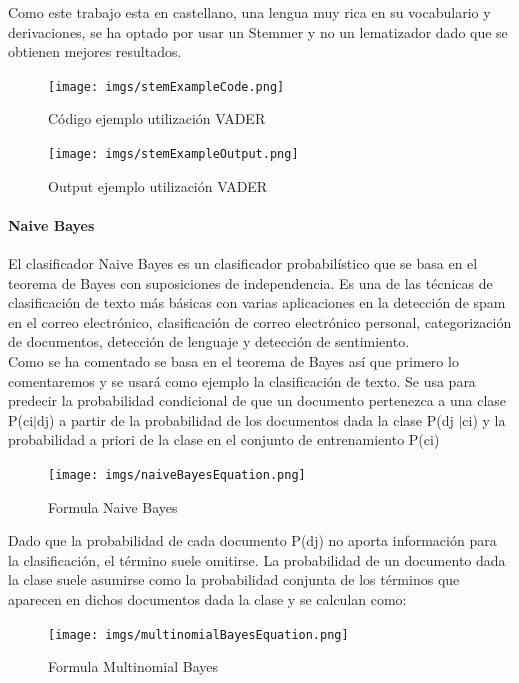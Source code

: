 \documentclass[../all.tex]{subfiles}
\begin{document}
        	Como este trabajo esta en castellano, una lengua muy rica en su vocabulario y derivaciones, se ha optado por usar un Stemmer y no un lematizador dado que se obtienen mejores resultados.\\
        	
        	\begin{figure}[H]
        		\centering
        		\texttt{[image: imgs/stemExampleCode.png]}
        		\caption{Código ejemplo utilización VADER}
        	\end{figure}
        	\begin{figure}[H]
        		\centering
        		\texttt{[image: imgs/stemExampleOutput.png]}
        		\caption{Output ejemplo utilización VADER}
        	\end{figure}
        	
        	

        \paragraph{Naive Bayes}
        
        	El clasificador Naive Bayes es un clasificador probabilístico que se basa en el teorema de Bayes con suposiciones de independencia. Es una de las técnicas de clasificación de texto más básicas con varias aplicaciones en la detección de spam en el correo electrónico, clasificación de correo electrónico personal, categorización de documentos, detección de lenguaje y detección de sentimiento. \\
        	
        	Como se ha comentado se basa en el teorema de Bayes así que primero lo comentaremos y se usará como ejemplo la clasificación de texto. Se usa para predecir la probabilidad condicional de que un documento pertenezca a una clase P(c{\tiny i}$|$d{\tiny j}) a partir de la probabilidad de los documentos dada la clase P(d{\tiny j} $|$c{\tiny i}) y la probabilidad a priori de la clase en el conjunto de entrenamiento P(c{\tiny i})
        	
        	\begin{figure}[H]
        		\centering
        		\texttt{[image: imgs/naiveBayesEquation.png]}
        		\caption{Formula Naive Bayes}
        	\end{figure}
        	
        	Dado que la probabilidad de cada documento P(d{\tiny j}) no aporta información
        	para la clasificación, el término suele omitirse. La probabilidad de un documento
        	dada la clase suele asumirse como la probabilidad conjunta de los términos que
        	aparecen en dichos documentos dada la clase y se calculan como:
        	\begin{figure}[H]
        		\centering
        		\texttt{[image: imgs/multinomialBayesEquation.png]}
        		\caption{Formula Multinomial Bayes}
        	\end{figure}
        
\end{document}

